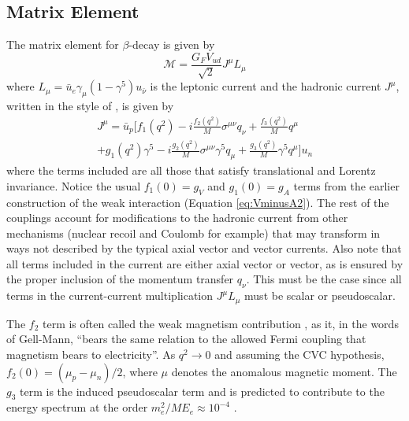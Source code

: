 \subsection{Matrix Element}
The matrix element for $\beta$-decay is given by
%
\begin{equation}
  \mathcal{M} = \frac{G_FV_{ud}}{\sqrt{2}} J^\mu L_\mu
  \label{eq:M}
\end{equation}
%
where $L_\mu = \bar{u}_e \gamma_\mu (1-\gamma^5) u_{\bar{\nu}}$ is the leptonic current
and the hadronic current $J^\mu$, written in the style of \cite{gardner2001}, is given by
%
\begin{multline}
  J^\mu = \bar{u}_p \bigg[ f_1(q^2) - i \frac{f_{2}(q^2)}{M}\sigma^{\mu\nu}q_\nu + \frac{f_3(q^2)}{M}q^\mu \\
    + g_1(q^2)\gamma^5 - i \frac{g_{2}(q^2)}{M}\sigma^{\mu\nu}\gamma^5q_\mu 
    +  \frac{g_3(q^2)}{M}\gamma^5q^\mu \bigg] u_n
  \label{eq:hadronicCurrent}
\end{multline}
%
where the terms included are all those that satisfy translational and Lorentz invariance. Notice the
usual $f_1(0)=g_V$ and $g_1(0) = g_A$ terms from the earlier construction of the weak interaction
(Equation \ref{eq:VminusA2}). The
rest of the couplings
account for modifications to the hadronic current from other mechanisms (nuclear recoil and Coulomb for example)
that may transform in ways not described by the typical axial vector and vector currents. Also note that all terms
included in the current are either axial vector or vector, as is ensured by the proper inclusion of the momentum
transfer $q_\nu$. This must be the case since all terms in the current-current multiplication $J^\mu L_\mu$ must be
scalar or pseudoscalar.

The $f_2$ term is often called the weak magnetism contribution \cite{gellmann1958}, as it, in
the words of Gell-Mann,
``bears the same relation to the allowed Fermi coupling that magnetism bears to electricity''.
As $q^2\rightarrow0$ and assuming the CVC hypothesis,
$f_2(0) = (\mu_p - \mu_n)/2$, where $\mu$ denotes the anomalous magnetic moment.
The $g_3$ term is the induced pseudoscalar term and is predicted to contribute
to the energy spectrum at the order $m_e^2/ME_e \approx 10^{-4}$
\cite{holstein1974recoil,plaster2012}.

